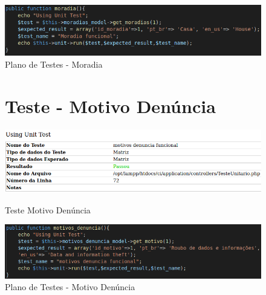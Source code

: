 \begin{apendicesenv}
\begin{figure}[htb]
    \centering
    \caption{\label{fig_timeline}Plano de Testes - Moradia}
	\includegraphics[width=1\textwidth]{imagens/cod_teste_moradia.png}
\end{figure}

\begin{figure}[!htbp]
\begin{flushleft}
    \section{Teste - Motivo Denúncia}
\end{flushleft}
    \centering 
    \caption{Teste Motivo Denúncia}
    \includegraphics[width=1\textwidth,pagecommand=\chapter{}]{imagens/teste_motivos_denuncia.png}
    \label{teste-motivo}
\end{figure}

\begin{figure}[htb]
    \centering
    \caption{\label{fig_timeline}Plano de Testes - Motivo Denúncia}
	\includegraphics[width=1\textwidth]{imagens/cod_teste_motivos_denuncia.png}
\end{figure}

\begin{figure}[!htbp]
\begin{flushleft}

\end{flushleft}
\end{figure}
\end{apendicesenv}
